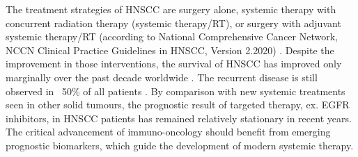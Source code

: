 \documentclass[12pt, a4paper]{article}
\begin{document}
The treatment strategies of HNSCC are surgery alone, systemic therapy with concurrent radiation therapy (systemic therapy/RT), or surgery with adjuvant systemic therapy/RT (according to National Comprehensive Cancer Network, NCCN Clinical Practice Guidelines in HNSCC, Version 2.2020) \citep{Pfister2020a}. Despite the improvement in those interventions, the survival of HNSCC has improved only marginally over the past decade worldwide \citep{hpa2019}.
The recurrent disease is still observed in ~50\% of all patients \citep{Forastiere2001,Warnakulasuriya2009}.
By comparison with new systemic treatments seen in other solid tumours, the prognostic result of targeted therapy, ex. EGFR inhibitors, in HNSCC patients has remained relatively stationary in recent years\citep{Argiris2015a}.
The critical advancement of immuno-oncology should benefit from emerging prognostic biomarkers, which guide the development of modern systemic therapy.





\end{document}
